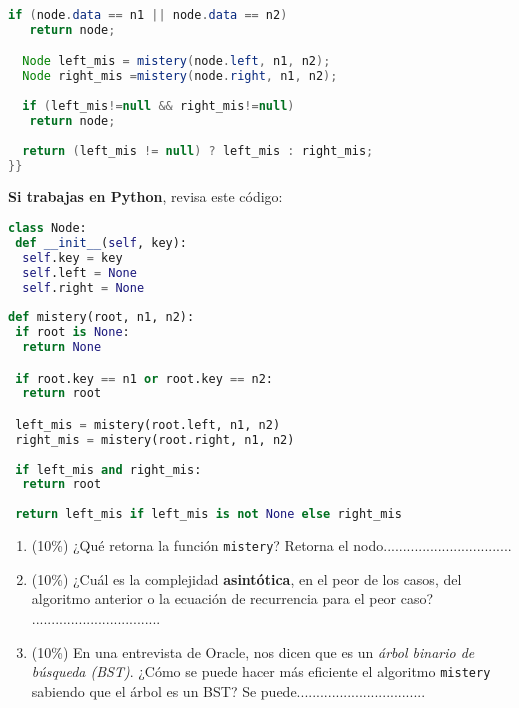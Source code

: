 \documentclass[10 pt]{article}
\begin{document}
\begin{multicols}{2}
{\begin{lstlisting}[language=Java]
  if (node.data == n1 || node.data == n2) 
   return node; 

  Node left_mis = mistery(node.left, n1, n2); 
  Node right_mis =mistery(node.right, n1, n2); 
 
  if (left_mis!=null && right_mis!=null) 
   return node; 
  
  return (left_mis != null) ? left_mis : right_mis; 
}} 
\end{lstlisting}
}

\textbf{Si trabajas en Python}, revisa este código:

{\footnotesize
\begin{lstlisting}[language=Python]
class Node:   
 def __init__(self, key): 
  self.key = key  
  self.left = None
  self.right = None
      
def mistery(root, n1, n2): 
 if root is None: 
  return None

 if root.key == n1 or root.key == n2: 
  return root  

 left_mis = mistery(root.left, n1, n2)  
 right_mis = mistery(root.right, n1, n2) 
 
 if left_mis and right_mis: 
  return root  
  
 return left_mis if left_mis is not None else right_mis 
\end{lstlisting}
}


\begin{enumerate}[label=\Alph*]
  \item (10\%) ¿Qué retorna la función \texttt{mistery}? Retorna el nodo.................................

  \item (10\%) ¿Cuál es la complejidad \textbf{asintótica}, en el peor de los casos, del algoritmo anterior o la ecuación de recurrencia para el peor caso? .................................

  \item (10\%) En una entrevista de Oracle, nos dicen que es un \emph{árbol binario de búsqueda (BST)}. ¿Cómo se puede hacer más eficiente el algoritmo \texttt{mistery} sabiendo que el árbol es un BST? Se puede.................................
\end{enumerate}




\end{multicols}
\end{document}
